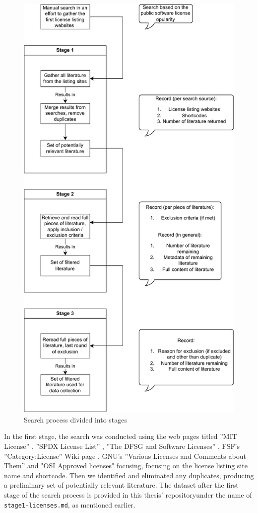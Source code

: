 \begin{figure}
	\centering
	\includegraphics[scale=0.67]{figures/search-process.pdf}
	\caption{Search process divided into stages}
	\label{fig:search-process}
\end{figure}

In the first stage, the search was conducted using the web pages titled  ''MIT License'' \citep{wikipedia:mit}, ''SPDX License List'' \citep{spdx:licenses}, ''The DFSG and Software Licenses'' \citep{debian:dfsg}, FSF's ''Category:License'' Wiki page \citep{fsf:licenselist}, GNU's ''Various Licenses and Comments about Them'' \citep{gnu:licenselist} and "OSI Approved licenses" \citep{osi:licenselist} focusing, focusing on the license listing site name and shortcode. Then we identified and eliminated any duplicates, producing a preliminary set of potentially relevant literature. The dataset after the first stage of the search process is provided in this thesis' repository\footnotemark[1] under the name of \texttt{stage1-licenses.md}, as mentioned earlier.


